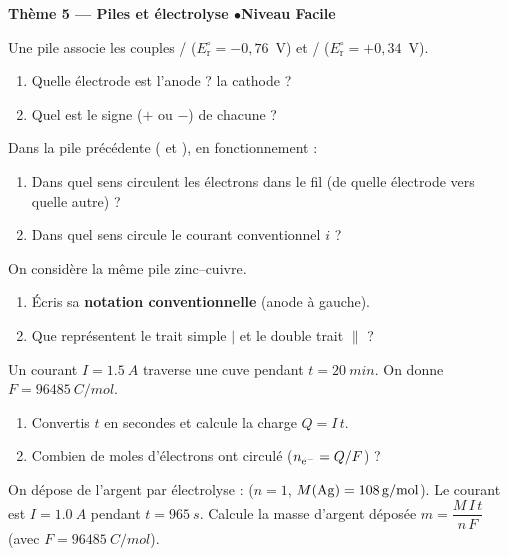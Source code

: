 \documentclass[11pt,a4paper]{article}
\begin{document}
\begin{center}\color{primarydark}\large\bfseries Thème 5 — Piles et électrolyse \quad$\bullet$\quad Niveau Facile\end{center}

\begin{exo}
Une pile associe les couples / ($E_{\mathrm{r}}^{\circ}=-0{,}76$~V) et
/ ($E_{\mathrm{r}}^{\circ}=+0{,}34$~V).
\begin{enumerate}[label=\alph*)]
  \item Quelle électrode est l'anode ? la cathode ?
  \item Quel est le signe ($+$ ou $-$) de chacune ?
\end{enumerate}
\end{exo}

\begin{exo}
Dans la pile précédente ( et ), en fonctionnement :
\begin{enumerate}[label=\alph*)]
  \item Dans quel sens circulent les électrons dans le fil (de quelle électrode vers quelle autre) ?
  \item Dans quel sens circule le courant conventionnel $i$ ?
\end{enumerate}
\end{exo}

\begin{exo}
On considère la même pile zinc--cuivre.
\begin{enumerate}[label=\alph*)]
  \item Écris sa \textbf{notation conventionnelle} (anode à gauche).
  \item Que représentent le trait simple $|$ et le double trait $\big\|$ ?
\end{enumerate}
\end{exo}

\begin{exo}
Un courant $I=\qty{1.5}{A}$ traverse une cuve pendant $t=\qty{20}{min}$. On donne
$F=\qty{96485}{C\per mol}$.
\begin{enumerate}[label=\alph*)]
  \item Convertis $t$ en secondes et calcule la charge $Q=I\,t$.
  \item Combien de moles d'électrons ont circulé ($n_{\ce{e^-}}=Q/F$) ?
\end{enumerate}
\end{exo}

\begin{exo}
On dépose de l'argent par électrolyse :  ($n=1$, $M(\ce{Ag})=\qty{108}{g\per mol}$).
Le courant est $I=\qty{1.0}{A}$ pendant $t=\qty{965}{s}$. Calcule la masse d'argent déposée
$m=\dfrac{M\,I\,t}{n\,F}$ (avec $F=\qty{96485}{C\per mol}$).
\end{exo}
\end{document}
